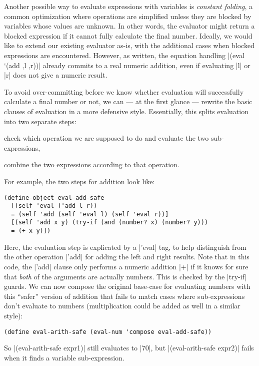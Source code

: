 Another possible way to evaluate expressions with variables is \emph{constant folding}, a common optimization where operations are simplified unless they are blocked by variables whose values are unknown.
In other words, the evaluator might return a blocked expression if it cannot fully calculate the final number.
Ideally, we would like to extend our existing evaluator as-is, with the additional cases when blocked expressions are encountered.  
However, as written, the equation handling \scm|(eval `(add ,l ,r))| already commits to a real numeric addition, even if evaluating \scm|l| or \scm|r| does not give a numeric result.

To avoid over-committing before we know whether evaluation will successfully calculate a final number or not, we can --- at the first glance --- rewrite the basic clauses of evaluation in a more defensive style.
Essentially, this splits evaluation into two separate steps:
\begin{enumerate*}[(1)]
\item check which operation we are supposed to do and evaluate the two sub-expressions,
\item combine the two expressions according to that operation.
\end{enumerate*}
For example, the two steps for addition look like:
\begin{verbatim} 
(define-object eval-add-safe
  [(self 'eval ('add l r))
  = (self 'add (self 'eval l) (self 'eval r))]
  [(self 'add x y) (try-if (and (number? x) (number? y)))
  = (+ x y)])
\end{verbatim}
Here, the evaluation step is explicated by a \scm|'eval| tag, to help distinguish from the other operation \scm|'add| for adding the left and right results.
Note that in this code, the \scm|'add| clause only performs a numeric addition \scm|+| if it knows for sure that \emph{both} of the arguments are actually numbers.
This is checked by the \scm|try-if| guards.
We can now compose the original base-case for evaluating numbers with this ``safer'' version of addition that fails to match cases where sub-expressions don't evaluate to numbers (multiplication could be added as well in a similar style):
\begin{verbatim}
(define eval-arith-safe (eval-num 'compose eval-add-safe))
\end{verbatim}
So \scm|(eval-arith-safe expr1)| still evaluates to \scm|70|, but \scm|(eval-arith-safe expr2)| fails when it finds a variable sub-expression.

